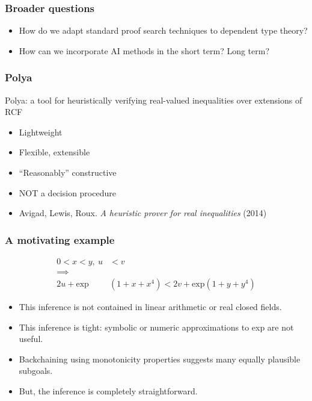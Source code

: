 \documentclass{beamer}
\begin{document}
\begin{frame}
\frametitle{Broader questions}

\begin{itemize}
\item How do we adapt standard proof search techniques to dependent type theory?

\item How can we incorporate AI methods in the short term? Long term?

\end{itemize}

\end{frame}


\begin{frame}
\frametitle{Polya}
\alert{Polya}: a tool for heuristically verifying real-valued inequalities over extensions of RCF
\begin{itemize}
\item Lightweight
\item Flexible, extensible
\item ``Reasonably'' constructive
\item NOT a decision procedure
\item Avigad, Lewis, Roux. \emph{A heuristic prover for real inequalities} (2014)
\end{itemize}
\end{frame}

\begin{frame}
 \frametitle{A motivating example}
 \begin{align*}
  0 < x < y,\ u & < v \\
  \implies & \\
  2u + \text{exp}&(1 + x + x^4) < 2v + \text{exp}(1 + y + y^4)
 \end{align*}
 
 \begin{itemize}
  \item This inference is not contained in linear arithmetic or real closed fields.
  \item This inference is tight: symbolic or numeric approximations to exp are not useful.
  \item {Backchaining} using monotonicity properties suggests many equally plausible subgoals.
  \item But, the inference is completely straightforward.
 \end{itemize}
 \end{frame}
\end{document}
